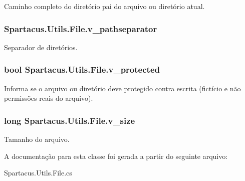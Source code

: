 Caminho completo do diretório pai do arquivo ou diretório atual. 

\hypertarget{classSpartacus_1_1Utils_1_1File_a45f2a42a093161cbe318734f67264294}{
\subsubsection[{v\+\_\+pathseparator}]{ Spartacus.\+Utils.\+File.\+v\+\_\+pathseparator}}\label{classSpartacus_1_1Utils_1_1File_a45f2a42a093161cbe318734f67264294}


Separador de diretórios. 

\hypertarget{classSpartacus_1_1Utils_1_1File_a5ede704209b7aa9ed88b414629228bd9}{
\subsubsection[{v\+\_\+protected}]{\setlength{\rightskip}{0pt plus 5cm}bool Spartacus.\+Utils.\+File.\+v\+\_\+protected}}\label{classSpartacus_1_1Utils_1_1File_a5ede704209b7aa9ed88b414629228bd9}


Informa se o arquivo ou diretório deve protegido contra escrita (fictício e não permissões reais do arquivo). 

\hypertarget{classSpartacus_1_1Utils_1_1File_a174b72e731e64d86db44c6d781011137}{
\subsubsection[{v\+\_\+size}]{\setlength{\rightskip}{0pt plus 5cm}long Spartacus.\+Utils.\+File.\+v\+\_\+size}}\label{classSpartacus_1_1Utils_1_1File_a174b72e731e64d86db44c6d781011137}


Tamanho do arquivo. 



A documentação para esta classe foi gerada a partir do seguinte arquivo\+:\begin{DoxyCompactItemize}
\item 
Spartacus.\+Utils.\+File.\+cs\end{DoxyCompactItemize}
